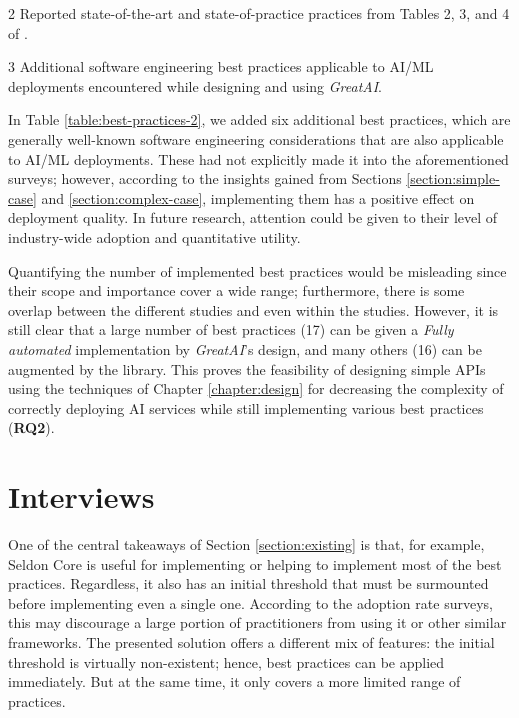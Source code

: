 \begin{table}
\begin{threeparttable}
{\begin{tabular}{P{7cm}@{\hskip 0.5cm}l@{\hskip 0cm}c}
\end{tabular}}
\begin{tablenotes}
    \item[2] Reported state-of-the-art and state-of-practice practices from Tables 2, 3, and 4 of \cite{john2020architecting}.
    \item[3] Additional software engineering best practices applicable to AI/ML deployments encountered while designing and using \textit{GreatAI}.
\end{tablenotes}
\end{threeparttable}
\end{table}

\FloatBarrier

In Table \ref{table:best-practices-2}, we added six additional best practices, which are generally well-known software engineering considerations that are also applicable to AI/ML deployments. These had not explicitly made it into the aforementioned surveys; however, according to the insights gained from Sections \ref{section:simple-case} and \ref{section:complex-case}, implementing them has a positive effect on deployment quality. In future research, attention could be given to their level of industry-wide adoption and quantitative utility.

Quantifying the number of implemented best practices would be misleading since their scope and importance cover a wide range; furthermore, there is some overlap between the different studies and even within the studies. However, it is still clear that a large number of best practices (17) can be given a \textit{Fully automated} implementation by \textit{GreatAI}'s design, and many others (16) can be augmented by the library. This proves the feasibility of designing simple APIs using the techniques of Chapter \ref{chapter:design} for decreasing the complexity of correctly deploying AI services while still implementing various best practices (\textbf{RQ2}).

\section{Interviews} \label{section:interviews}

One of the central takeaways of Section \ref{section:existing} is that, for example, Seldon Core is useful for implementing or helping to implement most of the best practices. Regardless, it also has an initial threshold that must be surmounted before implementing even a single one. According to the adoption rate surveys, this may discourage a large portion of practitioners from using it or other similar frameworks. The presented solution offers a different mix of features: the initial threshold is virtually non-existent; hence, best practices can be applied immediately. But at the same time, it only covers a more limited range of practices. 


